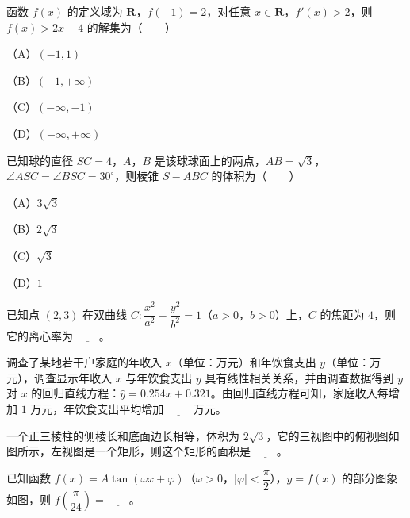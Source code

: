 \begin{question}
函数 $f(x)$ 的定义域为 $\mathbf R$，$f(-1)=2$，对任意 $x\in\mathbf R$，$f'(x)>2$，则 $f(x)>2x+4$ 的解集为\mbox{（　　）}

（A）$(-1,1)$

（B）$(-1,+\infty)$

（C）$(-\infty,-1)$

（D）$(-\infty,+\infty)$

\end{question}
\begin{question}
已知球的直径 $SC=4$，$A$，$B$ 是该球球面上的两点，$AB=\sqrt3$，$\angle ASC=\angle BSC=30^\circ$，则棱锥 $S-ABC$ 的体积为\mbox{（　　）}

（A）$3\sqrt3$

（B）$2\sqrt3$

（C）$\sqrt3$

（D）$1$

\end{question}

\begin{question}
已知点 $(2,3)$ 在双曲线 $C:\dfrac{x^2}{a^2}-\dfrac{y^2}{b^2}=1$（$a>0$，$b>0$）上，$C$ 的焦距为 $4$，则它的离心率为 $\underline{\qquad}$。

\end{question}
\begin{question}
调查了某地若干户家庭的年收入 $x$（单位：万元）和年饮食支出 $y$（单位：万元），调查显示年收入 $x$ 与年饮食支出 $y$ 具有线性相关关系，并由调查数据得到 $y$ 对 $x$ 的回归直线方程：$\hat y=0.254x+0.321$。由回归直线方程可知，家庭收入每增加 $1$ 万元，年饮食支出平均增加 $\underline{\qquad}$ 万元。

\Needspace{0.4\textheight}
\end{question}
\begin{question}
一个正三棱柱的侧棱长和底面边长相等，体积为 $2\sqrt3$，它的三视图中的俯视图如图所示，左视图是一个矩形，则这个矩形的面积是 $\underline{\qquad}$。
\nopagebreak[4]
\begin{center}\end{center}
\nopagebreak[4]
\Needspace{0.4\textheight}
\end{question}
\begin{question}
已知函数 $f(x)=A\tan(\omega x+\varphi)$（$\omega>0$，$|\varphi|<\dfrac\pi2$），$y=f(x)$ 的部分图象如图，则 $f\left(\dfrac\pi{24}\right)=\underline{\qquad}$。
\nopagebreak[4]
\begin{center}\end{center}
\nopagebreak[4]
\end{question}

